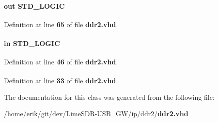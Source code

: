 \paragraph[{reset\+\_\+request\+\_\+n}]{ {\bfseries \textcolor{keywordflow}{out}\textcolor{vhdlchar}{ }} {\bfseries \textcolor{comment}{S\+T\+D\+\_\+\+L\+O\+G\+IC}\textcolor{vhdlchar}{ }} \hspace{0.3cm}{\ttfamily [Port]}}\label{classddr2_ac74f28d2140608ccd6de1e5f81731f0a}


Definition at line {\bf 65} of file {\bf ddr2.\+vhd}.

\paragraph[{soft\+\_\+reset\+\_\+n}]{ {\bfseries \textcolor{keywordflow}{in}\textcolor{vhdlchar}{ }} {\bfseries \textcolor{comment}{S\+T\+D\+\_\+\+L\+O\+G\+IC}\textcolor{vhdlchar}{ }} \hspace{0.3cm}{\ttfamily [Port]}}\label{classddr2_a53f1e0221c8ca31730a8efb91589fd7d}


Definition at line {\bf 46} of file {\bf ddr2.\+vhd}.

\paragraph[{std\+\_\+logic\+\_\+1164}]{\hspace{0.3cm}{\ttfamily [Package]}}\label{classddr2_acd03516902501cd1c7296a98e22c6fcb}


Definition at line {\bf 33} of file {\bf ddr2.\+vhd}.



The documentation for this class was generated from the following file\+:\begin{DoxyCompactItemize}
\item 
/home/erik/git/dev/\+Lime\+S\+D\+R-\/\+U\+S\+B\+\_\+\+G\+W/ip/ddr2/{\bf ddr2.\+vhd}\end{DoxyCompactItemize}
